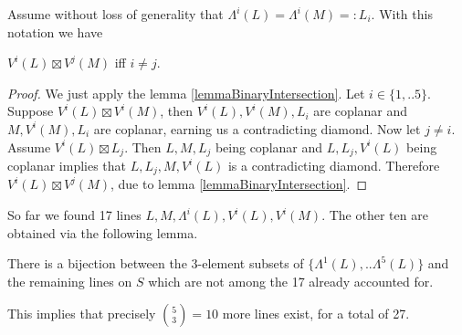 Assume without loss of generality that $\Lambda^i(L) = \Lambda^i(M) =: L_i$. With this notation we have
\begin{lemma} \label{lemmaCrosswiseIntersection}
$V^i(L) \boxtimes V^j(M)$ iff $i \neq j$.
\end{lemma}
\begin{proof}
We just apply the lemma \ref{lemmaBinaryIntersection}.
Let $i \in\{ 1,..5\}$.
Suppose $V^i(L) \boxtimes V^i(M)$, then $V^i(L),V^i(M),L_i$ are coplanar and $M,V^i(M),L_i$ are coplanar, earning us a contradicting diamond.
Now let $j \neq i$.
Assume $V^i(L) \boxtimes L_j$.
Then $L,M,L_j$ being coplanar and $L,L_j,V^i(L)$ being coplanar implies that $L,L_j,M,V^i(L)$ is a contradicting diamond.
Therefore $V^i(L) \boxtimes V^j(M)$, due to lemma \ref{lemmaBinaryIntersection}.
\end{proof}

So far we found 17 lines $L,M,\Lambda^i(L),V^i(L),V^i(M)$.
The other ten are obtained via the following lemma.

\begin{lemma}
There is a bijection between the 3-element subsets of $\{\Lambda^1(L),..\Lambda^5(L)\}$ and the remaining lines on $S$ which are not among the 17 already accounted for.
\end{lemma}

This implies that precisely $\binom{5}{3} = 10$ more lines exist, for a total of 27.

